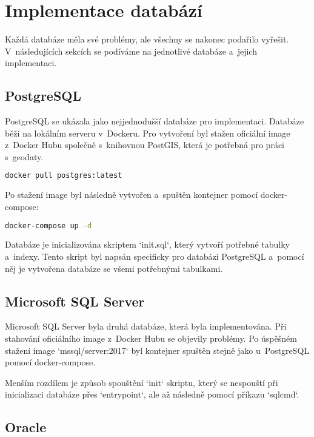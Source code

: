 \chapter{Implementace databází}

Každá databáze měla své problémy, ale všechny se nakonec podařilo vyřešit.  
V~následujících sekcích se podíváme na jednotlivé databáze a~jejich implementaci.

\section{PostgreSQL}

PostgreSQL se ukázala jako nejjednodušší databáze pro implementaci.  
Databáze běží na lokálním serveru v~Dockeru.  
Pro vytvoření byl stažen oficiální image z~Docker Hubu  
společně s~knihovnou PostGIS, která je potřebná pro práci s~geodaty.

\begin{lstlisting}[language=bash]
docker pull postgres:latest
\end{lstlisting}

Po stažení image byl následně vytvořen a~spuštěn kontejner pomocí docker-compose:

\begin{lstlisting}[language=bash]
docker-compose up -d
\end{lstlisting}

Databáze je inicializována skriptem `init.sql`, který vytvoří potřebné tabulky a~indexy.  
Tento skript byl napsán specificky pro databázi PostgreSQL a~pomocí něj je vytvořena databáze  
se všemi potřebnými tabulkami.

\section{Microsoft SQL Server}

Microsoft SQL Server byla druhá databáze, která byla implementována.  
Při stahování oficiálního image z~Docker Hubu se objevily problémy.  
Po úspěšném stažení image `mssql/server:2017` byl kontejner spuštěn stejně jako u~PostgreSQL  
pomocí docker-compose.

Menším rozdílem je způsob spouštění `init` skriptu, který se nespouští při inicializaci databáze  
přes `entrypoint`, ale až následně pomocí příkazu `sqlcmd`.

\section{Oracle}

